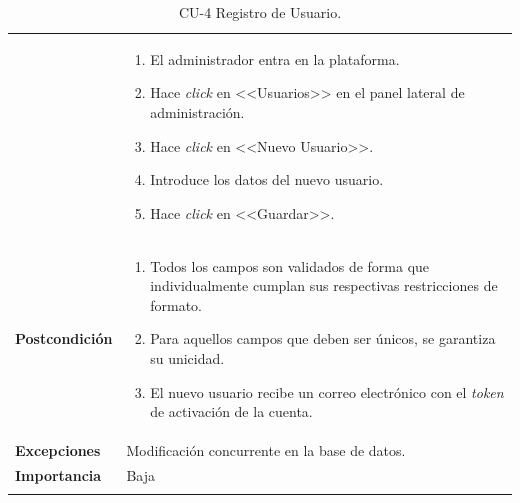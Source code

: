 \begin{longtable}[H]{@{}ll@{}}
\begin{minipage}[t]{0.23\columnwidth}
\end{minipage} & \begin{minipage}[t]{0.71\columnwidth}\raggedright\strut
\begin{enumerate}
\def\labelenumi{\arabic{enumi}.}
\tightlist
\item El administrador entra en la plataforma.
\item Hace \textit{click} en <<Usuarios>> en el panel lateral de administración.
\item Hace \textit{click} en <<Nuevo Usuario>>.
\item Introduce los datos del nuevo usuario.
\item Hace \textit{click} en <<Guardar>>.
\end{enumerate}\strut
\end{minipage}\tabularnewline
\begin{minipage}[t]{0.23\columnwidth}\raggedright\strut
\textbf{Postcondición}\strut
\end{minipage} & \begin{minipage}[t]{0.71\columnwidth}\raggedright\strut
\begin{enumerate}
\tightlist
\item Todos los campos son validados de forma que individualmente cumplan sus respectivas restricciones de formato.
\item Para aquellos campos que deben ser únicos, se garantiza su unicidad.
\item El nuevo usuario recibe un correo electrónico con el \textit{token} de activación de la cuenta.
\end{enumerate}\strut
\end{minipage}\tabularnewline
\begin{minipage}[t]{0.23\columnwidth}\raggedright\strut
\textbf{Excepciones}\strut
\end{minipage} & \begin{minipage}[t]{0.71\columnwidth}\raggedright\strut
Modificación concurrente en la base de datos.\strut
\end{minipage}\tabularnewline
\begin{minipage}[t]{0.23\columnwidth}\raggedright\strut
\textbf{Importancia}\strut
\end{minipage} & \begin{minipage}[t]{0.71\columnwidth}\raggedright\strut
Baja\strut
\end{minipage}\tabularnewline
\bottomrule
\caption{CU-4 Registro de Usuario.}
\end{longtable}

